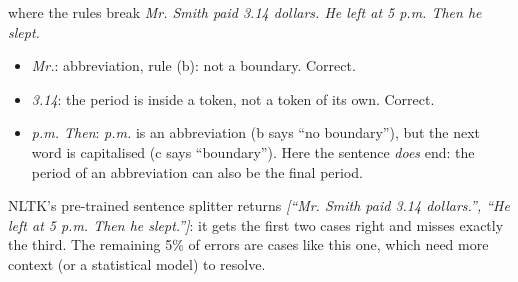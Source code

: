\begin{nbexample}{where the rules break}
\emph{Mr. Smith paid 3.14 dollars. He left at 5 p.m. Then he slept.}
\begin{itemize}[nosep]
  \item \emph{Mr.}: abbreviation, rule (b): not a boundary. Correct.
  \item \emph{3.14}: the period is inside a token, not a token of its own. Correct.
  \item \emph{p.m. Then}: \emph{p.m.} is an abbreviation (b says ``no boundary''), but
        the next word is capitalised (c says ``boundary''). Here the sentence
        \emph{does} end: the period of an abbreviation can also be the final period.
\end{itemize}
NLTK's pre-trained sentence splitter returns \emph{[``Mr. Smith paid 3.14 dollars.'',
``He left at 5 p.m. Then he slept.'']}: it gets the first two cases right and misses
exactly the third. The remaining 5\% of errors are cases like this one, which need more
context (or a statistical model) to resolve.
\end{nbexample}
